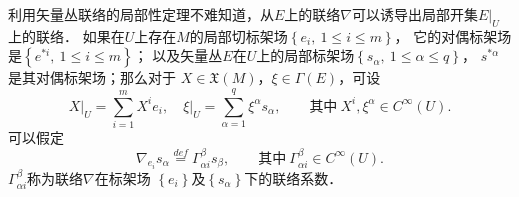 利用矢量丛联络的局部性定理不难知道，从$E$上的联络$\nabla$可以诱导出局部开集$\left.E\right|_U$上的联络．
如果在$U$上存在$M$的局部切标架场$\left\{e_i,\ 1 \leqslant i \leqslant m\right\}$，
它的对偶标架场是$\left\{e^{*i},\ 1 \leqslant i \leqslant m\right\}$；
以及矢量丛$E$在$U$上的局部标架场$\left\{s_\alpha,\ 1 \leqslant \alpha \leqslant q\right\}$，
$s^{*\alpha}$是其对偶标架场；那么对于 $X \in \mathfrak{X}(M)$，$ \xi \in \Gamma(E)$，可设
\begin{equation*}
    \left.X\right|_U= \sum_{i=1}^{m}X^i e_i,\left.\quad 
    \xi\right|_U= \sum_{\alpha=1}^{q}\xi^\alpha s_\alpha,
    \qquad \text{其中} \  X^i, \xi^\alpha \in C^{\infty}(U) .
\end{equation*}
可以假定
\begin{equation}\label{chfb:eqn_con-Gamma}
    \nabla_{e_i} s_\alpha \overset{def}{=} \Gamma_{\alpha i}^\beta s_\beta,
    \qquad \text{其中}\  \Gamma_{\alpha i}^\beta \in C^{\infty}(U). 
\end{equation}
$\Gamma_{\alpha i}^\beta$称为联络$\nabla$在标架场
$\left\{e_i\right\}$及$\left\{s_\alpha\right\}$下的{\heiti 联络系数}． 

